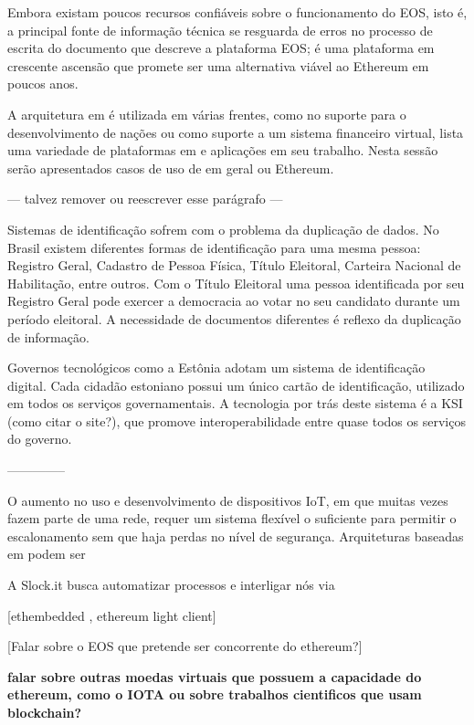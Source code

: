 \documentclass[tcc,capa]{texufpel}
\begin{document}
Embora existam poucos recursos confiáveis sobre o funcionamento do EOS, isto é, a principal fonte de informação técnica se resguarda de erros no processo de escrita do documento que descreve a plataforma EOS; é uma plataforma em crescente ascensão que promete ser uma alternativa viável ao Ethereum em poucos anos.

A arquitetura em \bchain é utilizada em várias frentes, como no suporte para o desenvolvimento de nações ou como suporte a um sistema financeiro virtual, \cite{gomez2017creating} lista uma variedade de plataformas em \bchain e aplicações em seu trabalho. Nesta sessão serão apresentados casos de uso de \bchain em geral ou Ethereum.

--- talvez remover ou reescrever esse parágrafo ---

Sistemas de identificação sofrem com o problema da duplicação de dados. No Brasil existem diferentes formas de identificação para uma mesma pessoa: Registro Geral, Cadastro de Pessoa Física, Título Eleitoral, Carteira Nacional de Habilitação, entre outros. Com o Título Eleitoral uma pessoa identificada por seu Registro Geral pode exercer a democracia ao votar no seu candidato durante um período eleitoral. A necessidade de documentos diferentes é reflexo da duplicação de informação.

Governos tecnológicos como a Estônia adotam um sistema de identificação digital. Cada cidadão estoniano possui um único cartão de identificação, utilizado em todos os serviços governamentais. A tecnologia por trás deste sistema é a \bchain KSI (como citar o site?), que promove interoperabilidade entre quase todos os serviços do governo.

--------------

O aumento no uso e desenvolvimento de dispositivos IoT, em que muitas vezes fazem parte de uma rede, requer um sistema flexível o suficiente para permitir o escalonamento sem que haja perdas no nível de segurança. Arquiteturas baseadas em \bchain podem ser 


    A Slock.it busca automatizar processos e interligar nós via 

[ethembedded , ethereum light client]


    [Falar sobre o EOS que pretende ser concorrente do ethereum?]

    \textbf{falar sobre outras moedas virtuais que possuem a capacidade do ethereum, como o IOTA ou sobre trabalhos cientificos que usam blockchain?}
\end{document}
